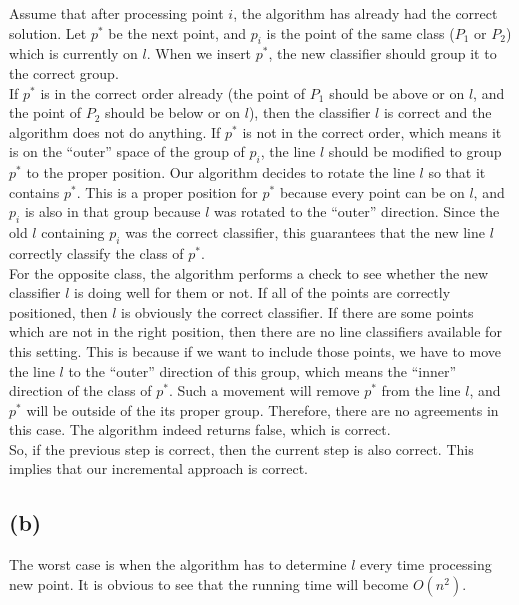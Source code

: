 Assume that after processing point $i$, the algorithm has already had the correct solution. Let $p^*$ be the next point, and $p_i$ is the point of the same class ($P_1$ or $P_2$) which is 
currently on $l$.  When we insert $p^*$, the new classifier should group it to the correct group. \\

If $p^*$ is in the correct order already (the point of $P_1$ should be above or on $l$, and the point of $P_2$ should be below or on $l$), then the classifier $l$ is correct and
the algorithm does not do anything. If $p^*$ is not in the correct order, which means it is on the ``outer'' space of the group of $p_i$, the line $l$ should be modified to group $p^*$ to the proper position. Our algorithm decides to rotate the line $l$ so that it contains $p^*$. This is a proper position for $p^*$ because every point can be on $l$, and $p_i$ is also in that group because $l$ was rotated to the ``outer'' direction. Since the old $l$ containing $p_i$ was the correct classifier, this guarantees that the new line $l$ correctly classify the class of $p^*$. \\ 

For the opposite class, the algorithm performs a check to see whether the new classifier $l$ is doing well for them or not. If all of the points are correctly positioned, then $l$ is obviously the correct classifier. If there are some points which are not in the right position, then there are no line classifiers available for this setting. This is because if we want to include those points, we have to move the line $l$ to the ``outer'' direction of this group, which means the ``inner'' direction of the class of $p^*$. Such a movement will remove $p^*$ from the line $l$, and $p^*$ will be outside of the its proper group. Therefore, there are no agreements in this case. The algorithm indeed returns false, which is correct. \\

So, if the previous step is correct, then the current step is also correct. This implies that our incremental approach is correct. \\


\subsection*{(b)}
The worst case is when the algorithm has to determine $l$ every time processing
new point. It is obvious to see that the running time will become $O(n^2)$. \\


